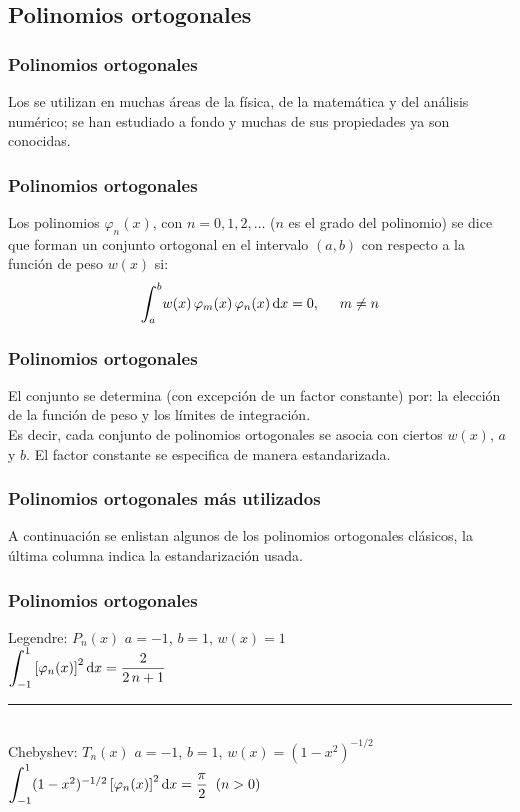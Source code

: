 \documentclass[12pt]{beamer}
\begin{document}
\subsection{Polinomios ortogonales}

\begin{frame}
\frametitle{Polinomios ortogonales}
Los  se utilizan en muchas áreas de la física, de la matemática y del análisis numérico; se han estudiado a fondo y muchas de sus propiedades ya son conocidas. 
\end{frame}
\begin{frame}
\frametitle{Polinomios ortogonales}
Los polinomios $\varphi_{n}(x)$, con $n = 0, 1, 2,\ldots$ ($n$ es el grado del polinomio) se dice que forman un conjunto ortogonal en el intervalo $(a, b)$ con respecto a la función de peso $w(x)$ si:
\pause
\begin{align*}
\scaleint{6ex}_{\bs a}^{b} w (x) \, \varphi_{m} (x) \, \varphi_{n} (x) \dd{x} = 0, \hspace{0.5cm} m \neq n
\end{align*}
\end{frame}
\begin{frame}
\frametitle{Polinomios ortogonales}
El conjunto se determina (con excepción de un factor constante) por: la elección de la función de peso y los límites de integración.
\\
\bigskip
\pause
Es decir, cada conjunto de polinomios ortogonales se asocia con ciertos $w(x)$, $a$ y $b$. \pause El factor constante se especifica de manera estandarizada.
\end{frame}
\begin{frame}
\frametitle{Polinomios ortogonales más utilizados}
A continuación se enlistan algunos de los polinomios ortogonales clásicos, la última columna indica la estandarización usada.
\end{frame}
\begin{frame}
\frametitle{Polinomios ortogonales}
Legendre: $P_{n} (x)$  \hspace{0.5cm} $a = -1$, $b = 1$, $w (x) = 1$ \\[0.5em]
$\scaleint{6ex}_{\bs -1}^{1} \left[ \varphi_{n} (x)\right]^{2} \dd{x} = \dfrac{2}{2 \, n + 1}$
\\[0.5em]
\rule{10cm}{1pt}
\\[0.5em]
\pause
Chebyshev: $T_{n} (x)$ \hspace{0.5cm} $a = -1$, $b = 1$, $w (x) = (1 - x^{2})^{-1/2}$ \\[0.5em]
$\scaleint{6ex}_{\bs -1}^{1} (1 - x^{2})^{-1/2} \left[ \varphi_{n} (x)\right]^{2} \dd{x} = \dfrac{\pi}{2} \hspace{0.2cm} (n > 0)$
\end{frame}
\end{document}
